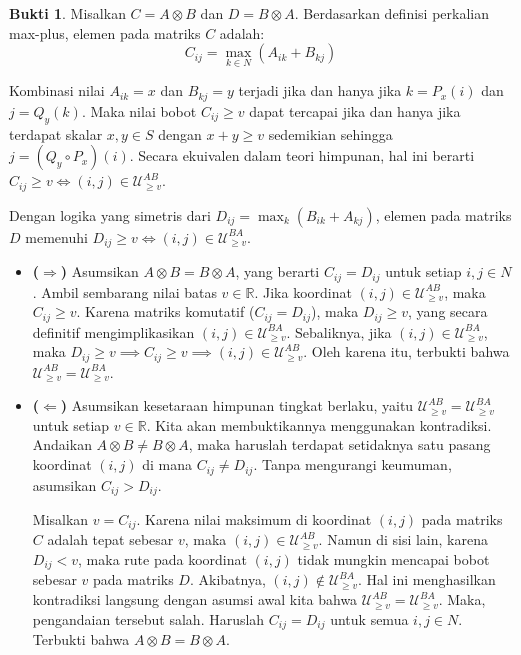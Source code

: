 \documentclass{article}
\theoremstyle{definition}
\newtheorem*{bukti}{Bukti}
\begin{document}
\begin{bukti}
  Misalkan $C = A \otimes B$ dan $D = B \otimes A$.
  Berdasarkan definisi perkalian max-plus, elemen pada matriks $C$ adalah:
  $$C_{ij} = \max_{k \in N} (A_{ik} + B_{kj})$$

  Kombinasi nilai $A_{ik} = x$ dan $B_{kj} = y$ terjadi jika dan hanya jika $k = P_x(i)$ dan $j = Q_y(k)$.
  Maka nilai bobot $C_{ij} \ge v$ dapat tercapai jika dan hanya jika terdapat skalar $x, y \in S$ dengan $x+y \ge v$ sedemikian sehingga $j = (Q_y \circ P_x)(i)$.
  Secara ekuivalen dalam teori himpunan, hal ini berarti $C_{ij} \ge v \iff (i, j) \in \mathcal{U}_{\ge v}^{AB}$.

  Dengan logika yang simetris dari $D_{ij} = \max_{k} (B_{ik} + A_{kj})$, elemen pada matriks $D$ memenuhi $D_{ij} \ge v \iff (i, j) \in \mathcal{U}_{\ge v}^{BA}$.
  \begin{itemize}
    \item \textbf{($\Rightarrow$)} Asumsikan $A \otimes B = B \otimes A$, yang berarti $C_{ij} = D_{ij}$ untuk setiap $i, j \in N$.
          Ambil sembarang nilai batas $v \in \mathbb{R}$.
          Jika koordinat $(i, j) \in \mathcal{U}_{\ge v}^{AB}$, maka $C_{ij} \ge v$.
          Karena matriks komutatif ($C_{ij} = D_{ij}$), maka $D_{ij} \ge v$, yang secara definitif mengimplikasikan $(i, j) \in \mathcal{U}_{\ge v}^{BA}$.
          Sebaliknya, jika $(i, j) \in \mathcal{U}_{\ge v}^{BA}$, maka $D_{ij} \ge v \implies C_{ij} \ge v \implies (i, j) \in \mathcal{U}_{\ge v}^{AB}$.
          Oleh karena itu, terbukti bahwa $\mathcal{U}_{\ge v}^{AB} = \mathcal{U}_{\ge v}^{BA}$.

    \item \textbf{($\Leftarrow$)} Asumsikan kesetaraan himpunan tingkat berlaku, yaitu $\mathcal{U}_{\ge v}^{AB} = \mathcal{U}_{\ge v}^{BA}$ untuk setiap $v \in \mathbb{R}$.
          Kita akan membuktikannya menggunakan kontradiksi. Andaikan $A \otimes B \neq B \otimes A$, maka haruslah terdapat setidaknya satu pasang koordinat $(i, j)$ di mana $C_{ij} \neq D_{ij}$.
          Tanpa mengurangi keumuman, asumsikan $C_{ij} > D_{ij}$.

          Misalkan $v = C_{ij}$. Karena nilai maksimum di koordinat $(i, j)$ pada matriks $C$ adalah tepat sebesar $v$, maka $(i, j) \in \mathcal{U}_{\ge v}^{AB}$.
          Namun di sisi lain, karena $D_{ij} < v$, maka rute pada koordinat $(i, j)$ tidak mungkin mencapai bobot sebesar $v$ pada matriks $D$. Akibatnya, $(i, j) \notin \mathcal{U}_{\ge v}^{BA}$.
          Hal ini menghasilkan kontradiksi langsung dengan asumsi awal kita bahwa $\mathcal{U}_{\ge v}^{AB} = \mathcal{U}_{\ge v}^{BA}$.
          Maka, pengandaian tersebut salah. Haruslah $C_{ij} = D_{ij}$ untuk semua $i, j \in N$.
          Terbukti bahwa $A \otimes B = B \otimes A$.
  \end{itemize}


\end{bukti}
\end{document}
